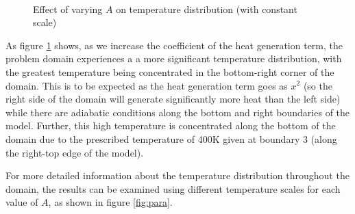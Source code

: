 \documentclass[letterpaper,10pt]{article}
\begin{document}
\begin{figure}[H]
	 \\
	\caption{Effect of varying $A$ on temperature distribution (with constant scale)}
	\label{fig:paraconst}
\end{figure}

As figure \ref{fig:paraconst} shows, as we increase the coefficient of the heat generation term, the problem domain experiences a a more significant temperature distribution, with the greatest temperature being concentrated in the bottom-right corner of the domain. This is to be expected as the heat generation term goes as $x^2$ (so the right side of the domain will generate significantly more heat than the left side) while there are adiabatic conditions along the bottom and right boundaries of the model. Further, this high temperature is concentrated along the bottom of the domain due to the prescribed temperature of \unit{400}{K} given at boundary 3 (along the right-top edge of the model).

For more detailed information about the temperature distribution throughout the domain, the results can be examined using different temperature scales for each value of $A$, as shown in figure \ref{fig:para}.
\end{document}
